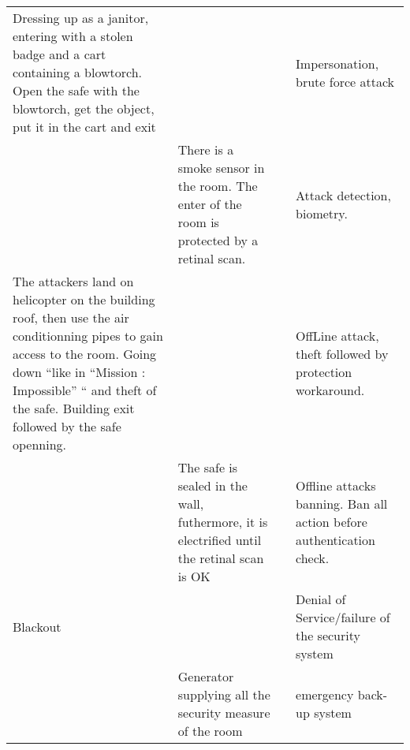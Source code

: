 \documentclass[11pt]{article} %
\begin{document}
\begin{longtable}{|p{3cm}|p{3cm}|p{3cm}|p{3cm}|}
Dressing up as a janitor, entering with a stolen badge and a cart containing a 
blowtorch. Open the safe with the blowtorch, get the object, put it in the cart
and exit & & & Impersonation, brute force attack \\
& There is a smoke sensor in the room. The enter of the room is protected by 
a retinal scan. & & Attack detection, biometry.\\
The attackers land on helicopter on the building roof, then use the air conditionning 
pipes to gain access to the room. Going down ``like in ``Mission : Impossible'' `` and 
theft of the safe. Building exit followed by the safe openning. & & & OffLine
attack, theft followed by protection workaround. \\
& The safe is sealed in the wall, futhermore, it is electrified until the retinal scan
is OK & &  Offline attacks banning. Ban all action before authentication check. \\
Blackout & & & Denial of Service/failure of the security system \\
& Generator supplying all the security measure of the room & & emergency back-up 
system \\

\end{longtable}
\end{document}
